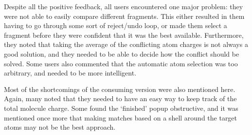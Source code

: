 Despite all the positive feedback, all users encountered one major problem: they were not able to easily compare different fragments. This either resulted in them having to go through some sort of reject/undo loop, or made them select a fragment before they were confident that it was the best available. Furthermore, they noted that taking the average of the conflicting atom charges is not always a good solution, and they needed to be able to decide how the conflict should be solved. Some users also commented that the automatic atom selection was too arbitrary, and needed to be more intelligent.

Most of the shortcomings of the consuming version were also mentioned here. Again, many noted that they needed to have an easy way to keep track of the total molecule charge. Some found the `finished' popup obstructive, and it was mentioned once more that making matches based on a shell around the target atoms may not be the best approach.

